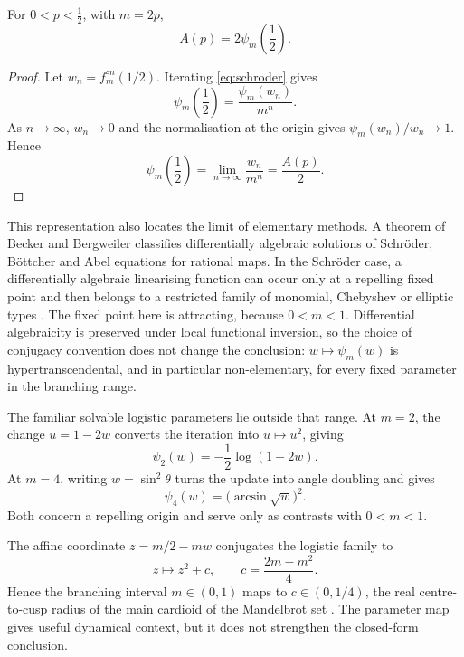 \begin{proposition}
For \(0<p<\tfrac12\), with \(m=2p\),
\begin{equation}
  A(p)=2\psi_m\!\left(\frac12\right).
  \label{eq:AeqKoenigs}
\end{equation}
\end{proposition}

\begin{proof}
Let \(w_n=f_m^{\circ n}(1/2)\).  Iterating
\eqref{eq:schroder} gives
\[
  \psi_m\!\left(\frac12\right)
  =\frac{\psi_m(w_n)}{m^n}.
\]
As \(n\to\infty\), \(w_n\to0\) and the normalisation at the origin gives
\(\psi_m(w_n)/w_n\to1\).  Hence
\[
  \psi_m\!\left(\frac12\right)
  =\lim_{n\to\infty}\frac{w_n}{m^n}
  =\frac{A(p)}{2}.
\]
\end{proof}

This representation also locates the limit of elementary methods.  A theorem of
Becker and Bergweiler classifies differentially algebraic solutions of Schr\"oder,
B\"ottcher and Abel equations for rational maps.  In the Schr\"oder case, a
differentially algebraic linearising function can occur only at a repelling fixed
point and then belongs to a restricted family of monomial, Chebyshev or elliptic
types \cite{Becker1995}.  The fixed point here is attracting, because
\(0<m<1\).  Differential algebraicity is preserved under local functional
inversion, so the choice of conjugacy convention does not change the conclusion:
\(w\mapsto\psi_m(w)\) is hypertranscendental, and in particular non-elementary,
for every fixed parameter in the branching range.

The familiar solvable logistic parameters lie outside that range.  At \(m=2\),
the change \(u=1-2w\) converts the iteration into \(u\mapsto u^2\), giving
\begin{equation}
  \psi_2(w)=-\frac12\log(1-2w).
  \label{eq:psi2}
\end{equation}
At \(m=4\), writing \(w=\sin^2\theta\) turns the update into angle doubling and
gives
\begin{equation}
  \psi_4(w)=\bigl(\arcsin\sqrt w\bigr)^2.
  \label{eq:psi4}
\end{equation}
Both concern a repelling origin and serve only as contrasts with \(0<m<1\).

The affine coordinate \(z=m/2-mw\) conjugates the logistic family to
\begin{equation}
  z\longmapsto z^2+c,
  \qquad
  c=\frac{2m-m^2}{4}.
  \label{eq:cofr}
\end{equation}
Hence the branching interval \(m\in(0,1)\) maps to
\(c\in(0,1/4)\), the real centre-to-cusp radius of the main cardioid of the
Mandelbrot set \cite{Milnor2006}.  The parameter map gives useful dynamical
context, but it does not strengthen the closed-form conclusion.

